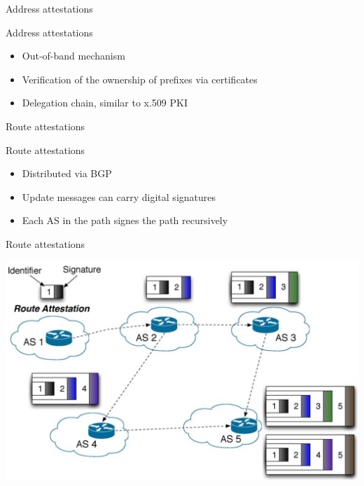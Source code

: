 \documentclass[notes=hide,yellow]{beamer}
\begin{document}
\begin{frame}{Address attestations}
	\begin{block}{Address attestations}
	\begin{itemize}
		\item Out-of-band mechanism
		\item Verification of the ownership of prefixes via certificates
		\item Delegation chain, similar to x.509 PKI
	\end{itemize}
	\end{block}

\end{frame}

\begin{frame}{Route attestations}
	\begin{block}{Route attestations}
	\begin{itemize}
		\item Distributed via BGP
		\item Update messages can carry digital signatures %
		\item Each AS in the path signes the path recursively 
	\end{itemize}
	\end{block}
\end{frame}

\begin{frame}{Route attestations}
			\begin{center}
				\includegraphics[scale=1.337]{sbgp.png}
			\end{center}
\end{frame}
\end{document}
